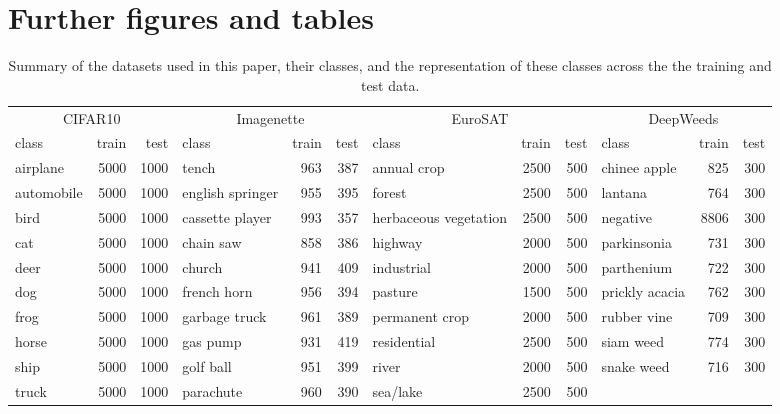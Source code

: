 \documentclass{article}
\begin{document}
\vfill
\FloatBarrier
\pagebreak
\section{Further figures and tables}



\begin{table}[H]
\centering
\caption{Summary of the datasets used in this paper, their classes, and the representation of these classes across the the training and test data.}
\label{tbl:dataset_description}
\tiny
\begin{tabular}{lrr|lrr|lrr|lrr}
  \hline
\multicolumn{3}{c|}{CIFAR10} & \multicolumn{3}{c|}{Imagenette} & \multicolumn{3}{c|}{EuroSAT}  & \multicolumn{3}{c}{DeepWeeds} \\
class & train & test & class & train & test & class & train & test & class & train & test \\ 
  \hline
airplane & 5000 & 1000 & tench & 963 & 387 & annual crop & 2500 & 500 & chinee apple & 825 & 300 \\ 
  automobile & 5000 & 1000 & english springer & 955 & 395 & forest & 2500 & 500 & lantana & 764 & 300 \\ 
  bird & 5000 & 1000 & cassette player & 993 & 357 & herbaceous vegetation & 2500 & 500 & negative & 8806 & 300 \\ 
  cat & 5000 & 1000 & chain saw & 858 & 386 & highway & 2000 & 500 & parkinsonia & 731 & 300 \\ 
  deer & 5000 & 1000 & church & 941 & 409 & industrial & 2000 & 500 & parthenium & 722 & 300 \\ 
  dog & 5000 & 1000 & french horn & 956 & 394 & pasture & 1500 & 500 & prickly acacia & 762 & 300 \\ 
  frog & 5000 & 1000 & garbage truck & 961 & 389 & permanent crop & 2000 & 500 & rubber vine & 709 & 300 \\ 
  horse & 5000 & 1000 & gas pump & 931 & 419 & residential & 2500 & 500 & siam weed & 774 & 300 \\ 
  ship & 5000 & 1000 & golf ball & 951 & 399 & river & 2000 & 500 & snake weed & 716 & 300 \\ 
  truck & 5000 & 1000 & parachute & 960 & 390 & sea/lake & 2500 & 500 &  &  &  \\ 
   \hline
\end{tabular}
 \normalsize
\end{table}
\end{document}

